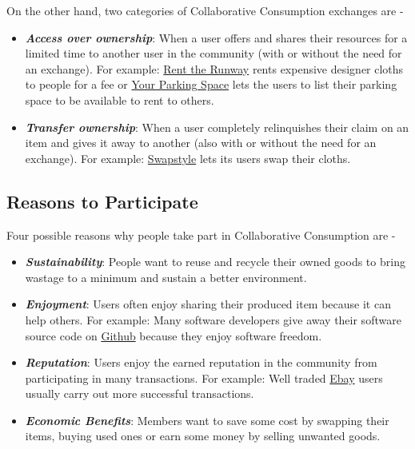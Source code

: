 On the other hand, two categories of Collaborative Consumption exchanges are \cite{Hamari:2015} - 

\begin{itemize}

	\item \textbf{\textit{Access over ownership}}: When a user offers and shares their resources for a limited time to another user in the community (with or without the need for an  exchange). For example: \href{https://www.renttherunway.com}{Rent the Runway} rents expensive designer cloths to people for a fee or \href{https://www.yourparkingspace.co.uk}{Your Parking Space} lets the users to list their parking space to be available to rent to others.
	
	\item \textbf{\textit{Transfer ownership}}: When a user completely relinquishes their claim on an item and gives it away to another (also with or without the need for an  exchange). For example: \href{http://www.swapstyle.com}{Swapstyle} lets its users swap their cloths. 

\end{itemize}

\subsection{Reasons to Participate}
Four possible reasons why people take part in Collaborative Consumption \cite{Hamari:2015} are - 

\begin{itemize}

	\item \textbf{\textit{Sustainability}}: People want to reuse and recycle their owned goods to bring wastage to a minimum and sustain a better environment.
	
	\item \textbf{\textit{Enjoyment}}: Users often enjoy sharing their produced item because it can help others. For example: Many software developers give away their software source code on \href{https://github.com}{Github} because they enjoy software freedom.
	
	\item \textbf{\textit{Reputation}}: Users enjoy the earned reputation in the community from participating in many transactions. For example: Well traded \href{http://www.ebay.co.uk}{Ebay} users usually carry out more successful transactions.
	
	\item \textbf{\textit{Economic Benefits}}: Members want to save some cost by swapping their items, buying used ones or earn some money by selling unwanted goods.
	
\end{itemize}


